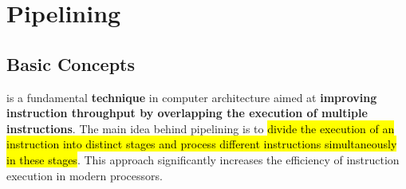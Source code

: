 \section{Pipelining}

\subsection{Basic Concepts}

 is a fundamental \textbf{technique} in computer architecture aimed at \textbf{improving instruction throughput by overlapping the execution of multiple instructions}. The main idea behind pipelining is to \hl{divide the execution of an instruction into distinct stages and process different instructions simultaneously in these stages}. This approach significantly increases the efficiency of instruction execution in modern processors.

